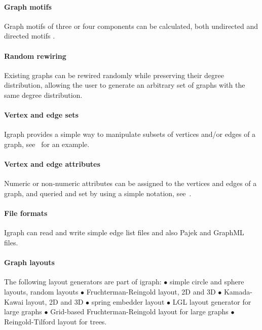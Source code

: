 \documentclass[twoside]{book}%
\begin{document}
\paragraph{Graph motifs} Graph motifs of three or four components can
be calculated, both undirected and directed motifs \cite{wernicke06}. 

\paragraph{Random rewiring} Existing graphs can be rewired randomly
while preserving their degree distribution, allowing the user to
generate an arbitrary set of graphs with the same degree distribution.

\paragraph{Vertex and edge sets} Igraph provides a simple way to
manipulate subsets of vertices and/or edges of a graph,
see~ for an example. 

\paragraph{Vertex and edge attributes} Numeric or non-numeric
attributes can be assigned to the vertices and edges of a graph, and
queried and set by using a simple notation, see~. 

\paragraph{File formats} Igraph can read and write simple edge
list files and also Pajek \cite{nooy05} and GraphML \cite{brandes01} files.

\paragraph{Graph layouts} The following layout generators are part of
igraph: $\bullet$ simple circle and sphere layouts, random layouts
$\bullet$ Fruchterman-Reingold layout, 2D and 3D \cite{fruchterman91} $\bullet$
Kamada-Kawai layout, 2D and 3D \cite{kamada89} $\bullet$ spring embedder layout
$\bullet$ LGL layout generator for large graphs \cite{adai04}
$\bullet$ Grid-based Fruchterman-Reingold layout for large graphs
$\bullet$ Reingold-Tilford layout \cite{reingold81} for trees.


\end{document}

